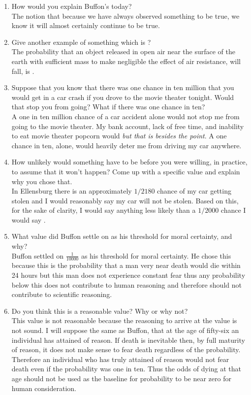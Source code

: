 \documentclass[a4paper, 12pt]{../../config/homework}
\begin{document}
\begin{enumerate}[label=\textbf{Task \arabic*}]
\item How would you explain Buffon's  today?
\\ The notion that because we have always observed something to be true, we know it will almost certainly continue to be true.

\item Give another example of something which is ?
\\ The probability that an object released in open air near the surface of the earth with sufficient mass to make negligible the effect of air resistance, will fall, is .

\item Suppose that you know that there was one chance in ten million that you would get in a car crash if you drove to the movie theater tonight. Would that stop you from going? What if there was one chance in ten?
\\ A one in ten million chance of a car accident alone would not stop me from going to the movie theater. My bank account, lack of free time, and inability to eat movie theater popcorn would \textit{but that is besides the point}. A one chance in ten, alone, would heavily deter me from driving my car anywhere.

\item How unlikely would something have to be before you were willing, in practice, to assume that it won't happen? Come up with a specific value and explain why you chose that.
\\ In Ellensburg there is an approximately \(1/2180\) chance of my car getting stolen and I would reasonably say my car will not be stolen. Based on this, for the sake of clarity, I would say anything less likely than a \(1/2000\) chance I would say .

\item What value did Buffon settle on as his threshold for moral certainty, and why?
\\ Buffon settled on \(\frac{1}{10000}\) as his threshold for moral certainty. He chose this because this is the probability that a man very near death would die within 24 hours but this man does not experience constant fear thus any probability below this does not contribute to human reasoning and therefore should not contribute to scientific reasoning.

\item Do you think this is a reasonable value? Why or why not?
\\ This value is not reasonable because the reasoning to arrive at the value is not sound. I will suppose the same as Buffon, that at the age of fifty-six an individual has attained  of reason. If death is inevitable then, by full maturity of reason, it does not make sense to fear death regardless of the probability. Therefore an individual who has truly attained  of reason would not fear death even if the probability was one in ten. Thus the odds of dying at that age should not be used as the baseline for probability to be near zero for human consideration.


\end{enumerate}
\end{document}
